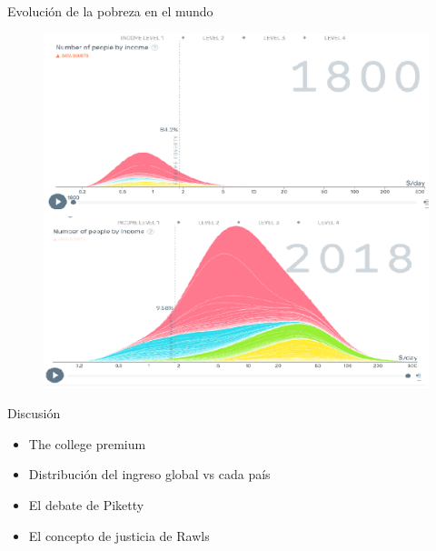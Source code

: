 \documentclass{beamer}
\begin{document}
\begin{frame}{Evolución de la pobreza en el mundo}
    \begin{figure} [H]
    \centering
     \href{https://www.gapminder.org/tools/#$model$markers$bubble$encoding$frame$speed:139;;;;;&chart-type=bubbles&url=v1}{
    \includegraphics[scale=0.75]{Figures/Gapminder3.png}}
\end{figure}
\end{frame}


\begin{frame}{Discusión}
\begin{itemize}
    \item The college premium
    \item Distribución del ingreso global vs cada país
    \item El debate de Piketty
    \item El concepto de justicia de Rawls 
\end{itemize}
    
\end{frame}
\end{document}
